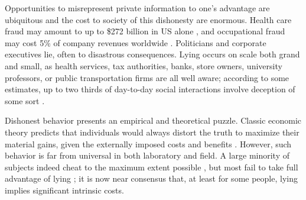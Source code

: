 \documentclass[12pt]{article}
\begin{document}
\par Opportunities to misrepresent private information to one’s advantage are ubiquitous and the cost to society of this dishonesty are enormous. Health care fraud may amount to up to \$272 billion in US alone \citep{BerwickHackbarth2012}, and occupational fraud may cost 5\% of company revenues worldwide \citep{assoc2016}. Politicians and corporate executives lie, often to disastrous consequences. Lying occurs on scale both grand and small, as health services, tax authorities, banks, store owners, university professors, or public transportation firms are all well aware; according to some estimates, up to two thirds of day-to-day social interactions involve deception of some sort \citep{DePauloetal1996}.

\par Dishonest behavior presents an empirical and theoretical puzzle. Classic economic theory predicts that individuals would always distort the truth to maximize their material gains, given the externally imposed costs and benefits \citep{Becker1968}. However, such behavior is far from universal in both laboratory and field. A large minority of subjects indeed cheat to the maximum extent possible \citep{Abeleretal2014,Cohnetal2014}, but most fail to take full advantage of lying \citep{Abeleretal2017}; it is now near consensus that, at least for some people, lying implies significant intrinsic costs.\footnotemark{}
\end{document}

